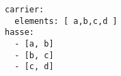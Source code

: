 \begin{verbatim}
carrier:
  elements: [ a,b,c,d ]
hasse:
  - [a, b]
  - [b, c]
  - [c, d]

\end{verbatim}